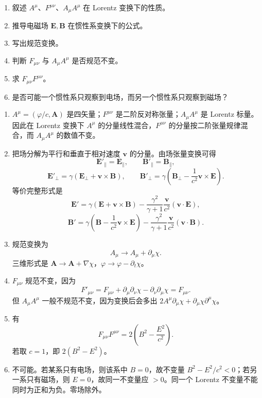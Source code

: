 

\begin{question}
\begin{enumerate}
  \item 叙述 $A^\mu$、$F^{\mu\nu}$、$A_\mu A^\mu$ 在 Lorentz 变换下的性质。
  \item 推导电磁场 $\mathbf E,\mathbf B$ 在惯性系变换下的公式。
  \item 写出规范变换。
  \item 判断 $F_{\mu\nu}$ 与 $A_\mu A^\mu$ 是否规范不变。
  \item 求 $F_{\mu\nu}F^{\mu\nu}$。
  \item 是否可能一个惯性系只观察到电场，而另一个惯性系只观察到磁场？
\end{enumerate}
\begin{solution}
\begin{enumerate}
  \item $A^\mu=(\varphi/c,\mathbf A)$ 是四矢量；$F^{\mu\nu}$ 是二阶反对称张量；$A_\mu A^\mu$ 是 Lorentz 标量。因此在 Lorentz 变换下 $A^\mu$ 的分量线性混合，$F^{\mu\nu}$ 的分量按二阶张量规律混合，而 $A_\mu A^\mu$ 的数值不变。

  \item 把场分解为平行和垂直于相对速度 $\mathbf v$ 的分量。由场张量变换可得
  \[
    \boxed{\mathbf E'_\parallel=\mathbf E_\parallel,
    \qquad
    \mathbf B'_\parallel=\mathbf B_\parallel,}
  \]
  \[
    \boxed{\mathbf E'_\perp=\gamma(\mathbf E_\perp+\mathbf v\times\mathbf B),
    \qquad
    \mathbf B'_\perp=\gamma\left(\mathbf B_\perp-\frac1{c^2}\mathbf v\times\mathbf E\right)} .
  \]
  等价完整形式是
  \[
    \mathbf E'=\gamma(\mathbf E+\mathbf v\times\mathbf B)
    -\frac{\gamma^2}{\gamma+1}\frac{\mathbf v}{c^2}(\mathbf v\cdot\mathbf E),
  \]
  \[
    \mathbf B'=\gamma\left(\mathbf B-\frac1{c^2}\mathbf v\times\mathbf E\right)
    -\frac{\gamma^2}{\gamma+1}\frac{\mathbf v}{c^2}(\mathbf v\cdot\mathbf B) .
  \]

  \item 规范变换为
  \[
    \boxed{A_\mu\to A_\mu+\partial_\mu\chi} .
  \]
  三维形式是 $\mathbf A\to\mathbf A+\nabla\chi$，$\varphi\to\varphi-\partial_t\chi$。

  \item $F_{\mu\nu}$ 规范不变，因为
  \[
    F'_{\mu\nu}=F_{\mu\nu}+\partial_\mu\partial_\nu\chi-
    \partial_\nu\partial_\mu\chi=F_{\mu\nu} .
  \]
  但 $A_\mu A^\mu$ 一般不规范不变，因为变换后会多出 $2A^\mu\partial_\mu\chi+\partial_\mu\chi\partial^\mu\chi$。

  \item 有
  \[
    \boxed{F_{\mu\nu}F^{\mu\nu}=2\left(B^2-\frac{E^2}{c^2}\right)} .
  \]
  若取 $c=1$，即 $2(B^2-E^2)$。

  \item 不可能。若某系只有电场，则该系中 $B=0$，故不变量 $B^2-E^2/c^2<0$；若另一系只有磁场，则 $E=0$，故同一不变量应 $>0$。同一个 Lorentz 不变量不能同时为正和为负。零场除外。
\end{enumerate}
\end{solution}
\end{question}

